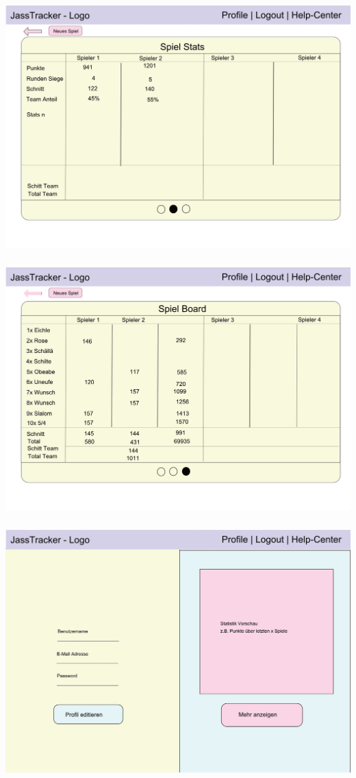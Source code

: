 \includegraphics[height=10cm, width=\textwidth]{resources/mockups/mockup-eof-stats.png}
\includegraphics[height=10cm, width=\textwidth]{resources/mockups/mockup-eof-scoreboard.png}
\includegraphics[height=10cm, width=\textwidth]{resources/mockups/mockup-profile-overview.png}
